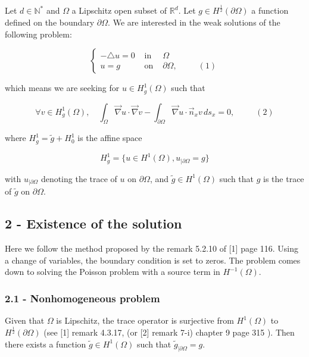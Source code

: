 \documentclass[11pt]{article}
\begin{document}
Let \(d\in\mathbb{N}^*\) and \(\Omega\) a Lipschitz open subset of
\(\mathbb{R}^d\). Let \(g\in H^{\frac{1}{2}}(\partial\Omega)\) a
function defined on the boundary \(\partial\Omega\). We are interested
in the weak solutions of the following problem:

\[
\left\{\begin{array}{ccl}
-\triangle u=0 &\textrm{ in }& \Omega\\[1.5ex]
u=g &\textrm{ on } &\partial \Omega,    \;\;\;\;\;\;\;\;\;(1)    
       \end{array} 
\right.
\]

which means we are seeking for \(u\in H^1_g(\Omega)\) such that

\[
\forall v\in H^1_{g}(\Omega),\quad \int_\Omega \vec\nabla u\cdot\vec\nabla v - \int_{\partial\Omega}\vec\nabla u\cdot\vec n_x v\, d s_x = 0,\;\;\;\;\;\;\;\;\;(2)
\]

where \(H^1_g=\tilde g+H^1_0\) is the affine space

\[
H^1_g = \{u \in H^1(\Omega), u_{|\partial\Omega}=g\}
\]

with \(u_{|\partial\Omega}\) denoting the trace of \(u\) on
\(\partial\Omega\), and \(\tilde g\in H^1(\Omega)\) such that \(g\) is
the trace of \(\tilde g\) on \(\partial\Omega\).

\hypertarget{existence-of-the-solution}{%
\subsection{2 - Existence of the
solution}\label{existence-of-the-solution}}

Here we follow the method proposed by the remark 5.2.10 of {[}1{]} page
116. Using a change of variables, the boundary condition is set to
zeros. The problem comes down to solving the Poisson problem with a
source term in \(H^{-1}(\Omega)\).

\hypertarget{nonhomogeneous-problem}{%
\subsubsection{2.1 - Nonhomogeneous
problem}\label{nonhomogeneous-problem}}

Given that \(\Omega\) is Lipschitz, the trace operator is surjective
from \(H^{1}(\Omega)\) to \(H^{\frac{1}{2}}(\partial\Omega)\) (see
{[}1{]} remark 4.3.17, (or {[}2{]} remark 7-i) chapter 9 page 315 ).
Then there exists a function \(\tilde g\in H^{1}(\Omega)\) such that
\(\tilde g_{|\partial\Omega}=g\).
\end{document}
